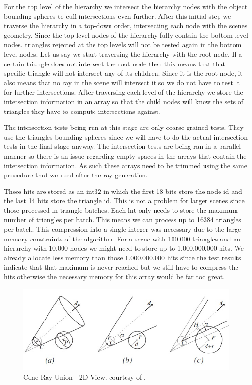 For the top level of the hierarchy we intersect the hierarchy nodes with the object bounding spheres to cull intersections even further. After this initial step we traverse the hierarchy in a top-down order, intersecting each node with the scenes geometry. Since the top level nodes of the hierarchy fully contain the bottom level nodes, triangles rejected at the top levels will not be tested again in the bottom level nodes. Let us say we start traversing the hierarchy with the root node. If a certain triangle does not intersect the root node then this means that that specific triangle will not intersect any of its children. Since it is the root node, it also means that no ray in the scene will intersect it so we do not have to test it for further intersections. After traversing each level of the hierarchy we store the intersection information in an array so that the child nodes will know the sets of triangles they have to compute intersections against. 

\medskip

The intersection tests being run at this stage are only coarse grained tests. They use the triangles bounding spheres since we will have to do the actual intersection tests in the final stage anyway. The intersection tests are being ran in a parallel manner so there is an issue regarding empty spaces in the arrays that contain the intersection information. As such these arrays need to be trimmed using the same procedure that we used after the ray generation.

\medskip

These hits are stored as an int32 in which the first 18 bits store the node id and the last 14 bits store the triangle id. This is not a problem for larger scenes since those processed in triangle batches. Each hit only needs to store the maximum number of triangles per batch. This means we can process up to 16384 triangles per batch. This compression into a single integer was necessary due to the large memory constraints of the algorithm. For a scene with 100.000 triangles and an hierarchy with 10.000 nodes we might need to store up to 1.000.000.000 hits. We already allocate less memory than those 1.000.000.000 hits since the test results indicate that that maximum is never reached but we still have to compress the hits otherwise the necessary memory for this array would be far too great.

\begin{figure}[!htb]
    \centering
    \includegraphics[scale=0.75]{Images/Node_Sphere_Intersection}
    \caption{\label{fig:crud2}Cone-Ray Union - 2D View. \small courtesy of \cite{Roger07}.}
\end{figure}

